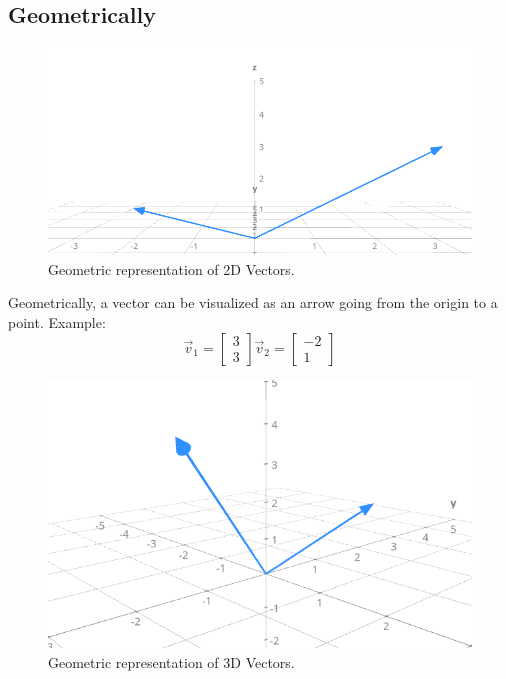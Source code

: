 \documentclass[12pt]{report}
\begin{document}
        \subsection{Geometrically}
            \begin{figure}[h]
                \centering
                \includegraphics[width=1\textwidth]{examples/1-1.png} 
                \caption{Geometric representation of 2D Vectors.}
                \label{fig:1}
            \end{figure}
        
            Geometrically, a vector can be visualized as an arrow going from the origin to a point.
            Example:
            \begin{equation}
                \vec{v}_1 = \begin{bmatrix} 3 \\ 3 \end{bmatrix}  
                \vec{v}_2 = \begin{bmatrix} -2 \\ 1 \end{bmatrix}
            \end{equation}
            
            \begin{figure}[H]
                \centering
                \includegraphics[width=1\textwidth]{examples/1-2.png} 
                \caption{Geometric representation of 3D Vectors.}
                \label{fig:2}
            \end{figure}
            
\end{document}
